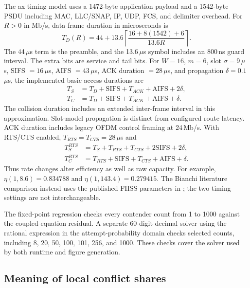 The ax timing model uses a 1472-byte application payload and a 1542-byte
PSDU including MAC, LLC/SNAP, IP, UDP, FCS, and delimiter overhead.
For $R>0$ in Mb/s, data-frame duration in microseconds is
\begin{equation}
T_D(R)=44+13.6\left\lceil\frac{16+8(1542)+6}{13.6R}\right\rceil.
\end{equation}
The 44\,$\mu$s term is the preamble, and the 13.6\,$\mu$s symbol includes
an 800\,ns guard interval. The extra bits are service and tail bits.
For $W=16$, $m=6$, slot $\sigma=9$\,$\mu$s, SIFS $=16$\,$\mu$s,
AIFS $=43$\,$\mu$s, ACK duration $=28$\,$\mu$s, and propagation
$\delta=0.1$\,$\mu$s, the implemented basic-access durations are
\begin{align}
T_S&=T_D+\mathrm{SIFS}+T_{ACK}+\mathrm{AIFS}+2\delta,\\
T_C&=T_D+\mathrm{SIFS}+T_{ACK}+\mathrm{AIFS}+\delta.
\end{align}
The collision duration includes an extended inter-frame interval in this
approximation. Slot-model propagation is distinct from configured route
latency. ACK duration includes legacy OFDM control framing at 24\,Mb/s.
With RTS/CTS enabled, $T_{RTS}=T_{CTS}=28$\,$\mu$s and
\begin{align}
T_S^{RTS}&=T_S+T_{RTS}+T_{CTS}+2\mathrm{SIFS}+2\delta,\\
T_C^{RTS}&=T_{RTS}+\mathrm{SIFS}+T_{CTS}+\mathrm{AIFS}+\delta.
\end{align}
Thus rate changes alter efficiency as well as raw capacity. For example,
$\eta(1,8.6)=0.834788$ and $\eta(1,143.4)=0.279415$. The Bianchi
literature comparison instead uses the published FHSS parameters in
; the two timing settings are not interchangeable.

The fixed-point regression checks every contender count from 1 to 1000
against the coupled-equation residual. A separate 60-digit decimal solver
using the rational expression in the attempt-probability domain checks
selected counts, including 8, 20, 50, 100, 101, 256, and 1000.
These checks cover the solver used by both runtime and figure generation.

\subsection{Meaning of local conflict shares}

